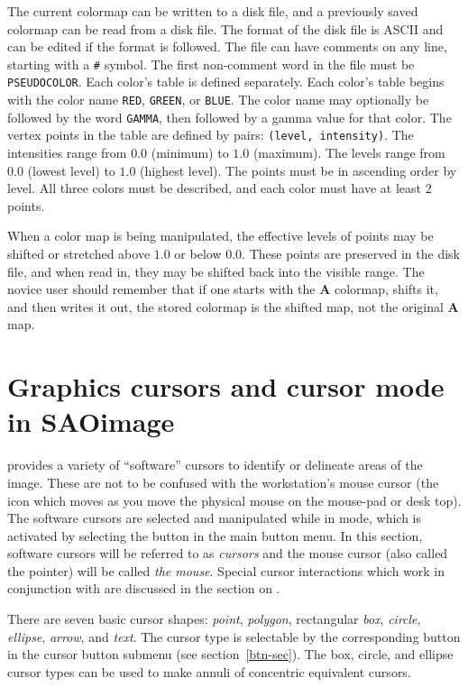 The current colormap can be written to a disk file, and a previously
saved colormap can be read from a disk file.  The format of the disk
file is ASCII and can be edited if the format is followed.  The file
can have comments on any line, starting with a {\tt \#} symbol.  The first
non-comment word in the file must be {\tt PSEUDOCOLOR}.  Each color's
table is defined separately.  Each color's table begins with the
color name {\tt RED}, {\tt GREEN}, or {\tt BLUE}.  The color name may optionally
be followed by the word {\tt GAMMA}, then followed by a gamma value for
that color.  The vertex points in the table are defined by pairs:
{\tt (level, intensity)}.  The intensities range from $0.0$ (minimum) to $1.0$
(maximum).  The levels range from $0.0$ (lowest level) to $1.0$ (highest
level).  The points must be in ascending order by level.  All three
colors must be described, and each color must have at least 2 points.

When a color map is being manipulated, the effective levels of points
may be shifted or stretched above $1.0$ or below $0.0$.  These points
are preserved in the disk file, and when read in, they may be shifted
back into the visible range.  The novice user should remember that if
one starts with the {\bf A} colormap, shifts it, and then writes it out,
the stored colormap is the shifted map, not the original {\bf A} map.

\section{ Graphics cursors and cursor mode in SAOimage } \label{cur-sec}

{\SAO} provides a variety of ``software'' cursors to identify or delineate
areas of the image.  These are not to be confused with the workstation's
mouse cursor (the icon which moves as you move the physical mouse on the
mouse-pad or desk top).  The software cursors are selected and manipulated
while in  mode, which is activated by selecting the  button
in the main button menu.  In this section, software cursors will be
referred to as {\em cursors} and the mouse cursor (also called the pointer)
will be called {\em the mouse}.  Special cursor interactions which work in
conjunction with {\IRAF} are discussed in the section on {\IRAF}.

There are seven basic cursor shapes: {\em point}, {\em polygon}, rectangular {\em box},
{\em circle}, {\em ellipse}, {\em arrow}, and {\em text}.  The cursor type is selectable by the
corresponding button in the cursor button submenu (see section~\ref{btn-sec}).
The box, circle, and ellipse cursor types can be used to make
annuli of concentric equivalent cursors.

